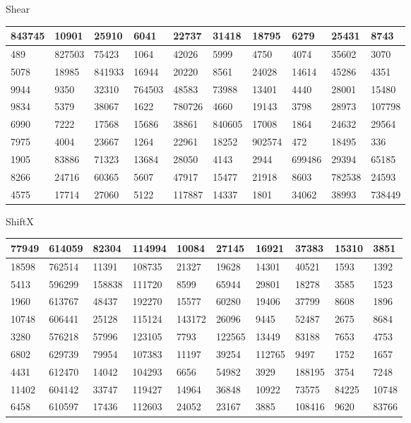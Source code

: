  Shear
\begin{table}
\begin{tabular}{|l|l|l|l|l|l|l|l|l|l|}
\hline
843745 & 10901 & 25910 & 6041 & 22737 & 31418 & 18795 & 6279 & 25431 & 8743 \\ \hline
489 & 827503 & 75423 & 1064 & 42026 & 5999 & 4750 & 4074 & 35602 & 3070 \\ \hline
5078 & 18985 & 841933 & 16944 & 20220 & 8561 & 24028 & 14614 & 45286 & 4351 \\ \hline
9944 & 9350 & 32310 & 764503 & 48583 & 73988 & 13401 & 4440 & 28001 & 15480 \\ \hline
9834 & 5379 & 38067 & 1622 & 780726 & 4660 & 19143 & 3798 & 28973 & 107798 \\ \hline
6990 & 7222 & 17568 & 15686 & 38861 & 840605 & 17008 & 1864 & 24632 & 29564 \\ \hline
7975 & 4004 & 23667 & 1264 & 22961 & 18252 & 902574 & 472 & 18495 & 336 \\ \hline
1905 & 83886 & 71323 & 13684 & 28050 & 4143 & 2944 & 699486 & 29394 & 65185 \\ \hline
8266 & 24716 & 60365 & 5607 & 47917 & 15477 & 21918 & 8603 & 782538 & 24593 \\ \hline
4575 & 17714 & 27060 & 5122 & 117887 & 14337 & 1801 & 34062 & 38993 & 738449 \\ \hline
\end{tabular}
\end{table}

 ShiftX
\begin{table}
\begin{tabular}{|l|l|l|l|l|l|l|l|l|l|}
\hline
77949 & 614059 & 82304 & 114994 & 10084 & 27145 & 16921 & 37383 & 15310 & 3851 \\ \hline
18598 & 762514 & 11391 & 108735 & 21327 & 19628 & 14301 & 40521 & 1593 & 1392 \\ \hline
5413 & 596299 & 158838 & 111720 & 8599 & 65944 & 29801 & 18278 & 3585 & 1523 \\ \hline
1960 & 613767 & 48437 & 192270 & 15577 & 60280 & 19406 & 37799 & 8608 & 1896 \\ \hline
10748 & 606441 & 25128 & 115124 & 143172 & 26096 & 9445 & 52487 & 2675 & 8684 \\ \hline
3280 & 576218 & 57996 & 123105 & 7793 & 122565 & 13449 & 83188 & 7653 & 4753 \\ \hline
6802 & 629739 & 79954 & 107383 & 11197 & 39254 & 112765 & 9497 & 1752 & 1657 \\ \hline
4431 & 612470 & 14042 & 104293 & 6656 & 54982 & 3929 & 188195 & 3754 & 7248 \\ \hline
11402 & 604142 & 33747 & 119427 & 14964 & 36848 & 10922 & 73575 & 84225 & 10748 \\ \hline
6458 & 610597 & 17436 & 112603 & 24052 & 23167 & 3885 & 108416 & 9620 & 83766 \\ \hline
\end{tabular}
\end{table}

